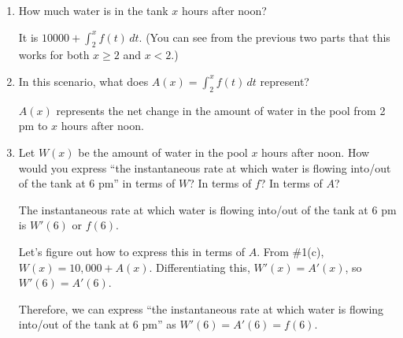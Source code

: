 \documentclass[main]{subfiles}
\begin{document}
\begin{enumerate}
\begin{enumerate}
  \item
    \begin{problem}[\vfill]
      How much water is in the tank $x$ hours after noon?
    \end{problem}

    \begin{solution}
      It is $\boxed{10000 + \int_2^x f(t)\,dt}$.  (You can see from the
      previous two parts that this works for both $x \geq 2$ and $x < 2$.)
    \end{solution}

  \item
    \begin{problem}[\vfill]
      In this scenario, what does $A(x)=\displaystyle\int_2^x f(t)\,dt$
      represent?
    \end{problem}

    \begin{solution}
      $A(x)$ represents the net change in the amount of water in the
      pool from 2 pm to $x$ hours after noon. 
    \end{solution}

  \item


    \begin{problem}[\stretch{2}]
      Let $W(x)$ be the amount of water in the pool $x$ hours after noon.
      How would you express ``the instantaneous rate at which water is
      flowing into/out of the tank at 6 pm'' in terms of $W$?  In terms of
      $f$?  In terms of $A$?
    \end{problem}

    \begin{solution}
      The instantaneous rate at which water is flowing into/out of the tank
      at 6 pm is $W'(6)$ or $f(6)$.

      Let's figure out how to express this in terms of $A$.  From
      {{{{\#1}}(c)}}, $W(x) = 10,000 +
      A(x)$.  Differentiating this, $W'(x) = A'(x)$, so
      $W'(6) = A'(6)$.

      Therefore, we can express ``the instantaneous rate at which water is
      flowing into/out of the tank at 6 pm'' as $\boxed{W'(6) =
        A'(6) = f(6)}$.
    \end{solution}

  \end{enumerate}
\end{enumerate}
\end{document}
